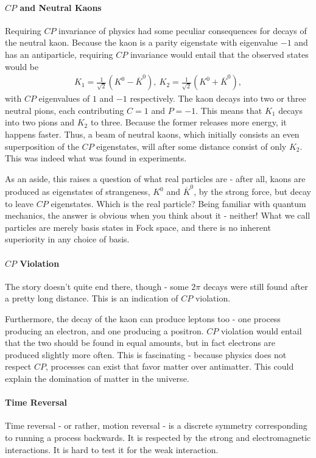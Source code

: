\paragraph{$CP$ and Neutral Kaons}
Requiring $CP$ invariance of physics had some peculiar consequences for decays of the neutral kaon. Because the kaon is a parity eigenstate with eigenvalue $-1$ and has an antiparticle, requiring $CP$ invariance would entail that the observed states would be
\begin{align*}
	K_{1} = \frac{1}{\sqrt{2}}(K^{0} - \overline{K}^{0}),\ K_{2} = \frac{1}{\sqrt{2}}(K^{0} + \overline{K}^{0}),
\end{align*}
with $CP$ eigenvalues of $1$ and $-1$ respectively. The kaon decays into two or three neutral pions, each contributing $C = 1$ and $P = -1$. This means that $K_{1}$ decays into two pions and $K_{2}$ to three. Because the former releases more energy, it happens faster. Thus, a beam of neutral kaons, which initially consists an even superposition of the $CP$ eigenstates, will after some distance consist of only $K_{2}$. This was indeed what was found in experiments.

As an aside, this raises a question of what real particles are - after all, kaons are produced as eigenstates of strangeness, $K^{0}$ and $\overline{K}^{0}$, by the strong force, but decay to leave $CP$ eigenstates. Which is the real particle? Being familiar with quantum mechanics, the answer is obvious when you think about it - neither! What we call particles are merely basis states in Fock space, and there is no inherent superiority in any choice of basis.

\paragraph{$CP$ Violation}
The story doesn't quite end there, though - some $2\pi$ decays were still found after a pretty long distance. This is an indication of $CP$ violation.

Furthermore, the decay of the kaon can produce leptons too - one process producing an electron, and one producing a positron. $CP$ violation would entail that the two should be found in equal amounts, but in fact electrons are produced slightly more often. This is fascinating - because physics does not respect $CP$, processes can exist that favor matter over antimatter. This could explain the domination of matter in the universe.

\paragraph{Time Reversal}
Time reversal - or rather, motion reversal - is a discrete symmetry corresponding to running a process backwards. It is respected by the strong and electromagnetic interactions. It is hard to test it for the weak interaction.

